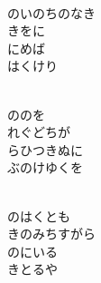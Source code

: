 \documentclass[10pt,b5j]{tarticle} %
\begin{document}
\begin{enumerate}
\begin{minipage}[c]{\blocksize}
        \vspace{\linespace}
        \item~\\
        のいのちのなき\\
        きをに\\
        にめば\\
        はくけり
        
        \vspace{\linespace}
        \item~\\
        ののを\\
        れぐどちが\\
        らひつきぬに\\
        ぶのけゆくを
        
        \vspace{\linespace}
        \item~\\
        のはくとも\\
        きのみちすがら\\
        のにいる\\
        きとるや
    
    \end{minipage}
\end{enumerate} %
\end{document}
